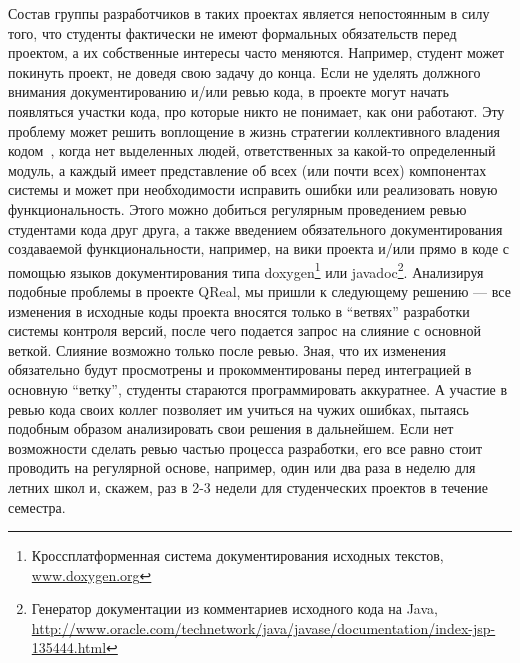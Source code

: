 \documentclass[a4paper]{article}
\begin{document}
Состав группы разработчиков в таких проектах является непостоянным в силу того, что студенты фактически не имеют формальных обязательств перед проектом, а их собственные интересы часто меняются. Например, студент может покинуть проект, не доведя свою задачу до конца. Если не уделять должного внимания документированию и/или ревью кода, в проекте могут начать появляться участки кода, про которые никто не понимает, как они работают. Эту проблему может решить воплощение в жизнь стратегии коллективного владения кодом~\cite{collectiveOwnership}, когда нет выделенных людей, ответственных за какой-то определенный модуль, а каждый имеет представление об всех (или почти всех) компонентах системы и может при необходимости исправить ошибки или реализовать новую функциональность. Этого можно добиться регулярным проведением ревью студентами кода друг друга, а также введением обязательного документирования создаваемой функциональности, например, на вики проекта и/или прямо в коде с помощью языков документирования типа doxygen\footnote{Кроссплатформенная система документирования исходных текстов, \url{www.doxygen.org}} или javadoc\footnote{Генератор документации из комментариев исходного кода на Java, \url{http://www.oracle.com/technetwork/java/javase/documentation/index-jsp-135444.html}}. Анализируя подобные проблемы в проекте QReal, мы пришли к следующему решению --- все изменения в исходные коды проекта вносятся только в ``ветвях'' разработки системы контроля версий, после чего подается запрос на слияние с основной веткой. 
Слияние возможно только после ревью. Зная, что их изменения обязательно будут просмотрены и прокомментированы перед интеграцией в основную ``ветку'', студенты стараются программировать аккуратнее. А участие в ревью кода своих коллег позволяет им учиться на чужих ошибках, пытаясь подобным образом анализировать свои решения в дальнейшем. Если нет возможности сделать ревью частью процесса разработки, его все равно стоит проводить на регулярной основе, например, один или два раза в неделю для летних школ и, скажем, раз в 2-3 недели для студенческих проектов в течение семестра.
\end{document}
